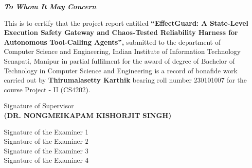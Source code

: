 \documentclass[a4paper, 11pt, oneside]{report}
\begin{document}
\begin{center}
{\Huge \textbf{\emph{To Whom It May Concern}}}

\vspace{1.2cm}

\linespread{1.1}
\large
This is to certify that the project report entitled 
\textbf{``EffectGuard: A State-Level Execution Safety Gateway and Chaos-Tested Reliability Harness for Autonomous Tool-Calling Agents'',}
submitted to the department of Computer Science and Engineering, Indian Institute of Information Technology Senapati, Manipur in partial fulfilment for the award of degree of Bachelor of Technology in Computer Science and Engineering is a record of bonafide work carried out by \textbf{Thirumalasetty Karthik} bearing roll number 230101007 for the course Project - II (CS4202).
\end{center}

\vspace{0.8cm}

\begin{flushright}
\large Signature of Supervisor\\[0.2cm]
\textbf{(DR. NONGMEIKAPAM KISHORJIT SINGH)}
\end{flushright}

\vspace{1cm}

\noindent Signature of the Examiner 1 \hspace{0.1cm}\makebox[3cm]{\dotfill}\\[0.3cm]
\noindent Signature of the Examiner 2 \hspace{0.1cm}\makebox[3cm]{\dotfill}\\[0.3cm]
\noindent Signature of the Examiner 3 \hspace{0.1cm}\makebox[3cm]{\dotfill}\\[0.3cm]
\noindent Signature of the Examiner 4 \hspace{0.1cm}\makebox[3cm]{\dotfill}
\end{document}
